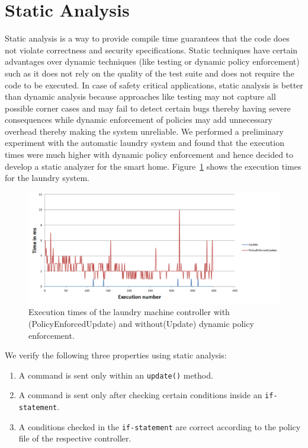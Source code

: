 \documentclass{article}
\begin{document}
\section{Static Analysis}
\label{sec:analysis}
Static analysis is a way to provide compile time guarantees that the code does not violate correctness and security specifications. Static techniques have certain advantages over dynamic techniques (like testing or dynamic policy enforcement) such as it does not rely on the quality of the test suite and does not require the code to be executed. In case of safety critical applications, static analysis is better than dynamic analysis because approaches like testing may not capture all possible corner cases and may fail to detect certain bugs thereby having severe consequences while dynamic enforcement of policies may add unnecessary overhead thereby making the system unreliable. We performed a preliminary experiment with the automatic laundry system and found that the execution times were much higher with dynamic policy enforcement and hence decided to develop a static analyzer for the smart home. Figure~\ref{fig:dynamic} shows the execution times for the laundry system. 

\begin{figure}[htpb]
\begin{center}
\includegraphics[scale=0.4, trim = 0 0 0 0]{results_update.png}
\caption{Execution times of the laundry machine controller with (PolicyEnforcedUpdate) and without(Update) dynamic policy enforcement.}
\label{fig:dynamic}
\end{center}
\end{figure}
We verify the following three properties using static analysis:
\begin{enumerate}[topsep=0pt,itemsep=-1ex,partopsep=1ex,parsep=1ex]
    \item A command is sent only within an \texttt{update()} method.
    \item A command is sent only after checking certain conditions inside an \texttt{if-statement}.
    \item A conditions checked in the \texttt{if-statement} are correct according to the policy file of the respective controller.
\end{enumerate}
\end{document}
